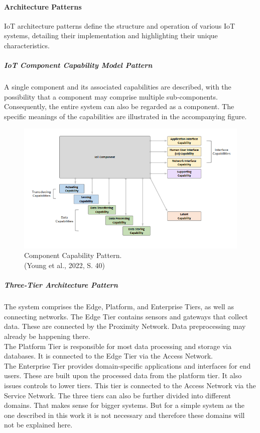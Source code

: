 \paragraph{Architecture Patterns}
IoT architecture patterns define the structure and operation of various IoT systems, detailing their implementation and highlighting their unique characteristics.
\subparagraph{IoT Component Capability Model Pattern}
A single component and its associated capabilities are described, with the possibility that a component may comprise multiple sub-components. Consequently, the entire system can also be regarded as a component. The specific meanings of the capabilities are illustrated in the accompanying figure.
\begin{figure}[H]
	\includegraphics[width=\linewidth]{pic/IIRA-model-component-pattern.png}
	\caption{Component Capability Pattern. \\ (Young et al., 2022, S. 40)}
	\label{fig:Model-Component-Pattern}
\end{figure}
\subparagraph{Three-Tier Architecture Pattern}
The system comprises the Edge, Platform, and Enterprise Tiers, as well as connecting networks. The Edge Tier contains sensors and gateways that collect data. These are connected by the Proximity Network. Data preprocessing may already be happening there.
\\The Platform Tier is responsible for most data processing and storage via databases. It is connected to the Edge Tier via the Access Network.
\\The Enterprise Tier provides domain-specific applications and interfaces for end users. These are built upon the processed data from the platform tier. It also issues controls to lower tiers. This tier is connected to the Access Network via the Service Network.
The three tiers can also be further divided into different domains. That makes sense for bigger systems. But for a simple system as the one described in this work it is not necessary and therefore these domains will not be explained here.
